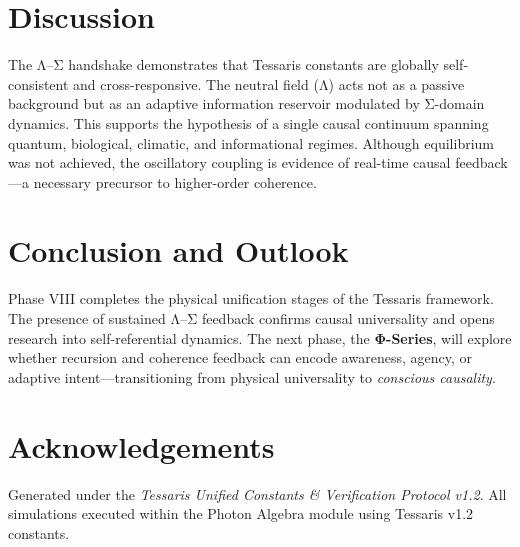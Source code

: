 \documentclass[11pt,a4paper]{article}
\begin{document}
\section{Discussion}
The Λ–Σ handshake demonstrates that Tessaris constants are globally
self-consistent and cross-responsive.  
The neutral field (Λ) acts not as a passive background but as an adaptive
information reservoir modulated by Σ-domain dynamics.  
This supports the hypothesis of a single causal continuum spanning quantum,
biological, climatic, and informational regimes.  
Although equilibrium was not achieved, the oscillatory coupling is evidence of
real-time causal feedback—a necessary precursor to higher-order coherence.

\section{Conclusion and Outlook}
Phase VIII completes the physical unification stages of the Tessaris framework.
The presence of sustained Λ–Σ feedback confirms causal universality and opens
research into self-referential dynamics.  
The next phase, the \textbf{Φ-Series}, will explore whether recursion and
coherence feedback can encode awareness, agency, or adaptive intent—transitioning
from physical universality to \emph{conscious causality}.

\section*{Acknowledgements}
Generated under the \textit{Tessaris Unified Constants \& Verification Protocol v1.2}.
All simulations executed within the Photon Algebra module using Tessaris v1.2 constants.
\end{document}

